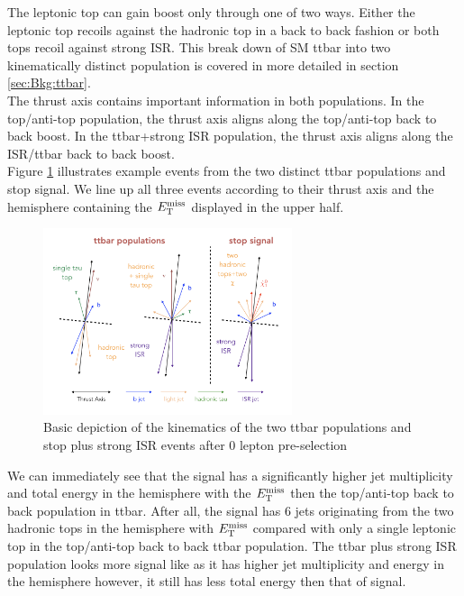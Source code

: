\indent  The leptonic top can gain boost only through one of two ways.  Either the leptonic top recoils against the hadronic top in a back to back fashion or both tops recoil against strong ISR.  This break down of SM ttbar into two kinematically distinct population is covered in more detailed in section \ref{sec:Bkg:ttbar}.  \\

\indent The thrust axis contains important information in both populations.  In the top/anti-top population, the thrust axis aligns along the top/anti-top back to back boost.  In the ttbar+strong ISR population, the thrust axis aligns along the ISR/ttbar back to back boost.  \\

\indent Figure \ref{fig:ttbar:3pop} illustrates example events from the two distinct ttbar populations and stop signal.  We line up all three events according to their thrust axis and the hemisphere containing the $E_{\mathrm{T}}^{\mathrm{miss}}$ displayed in the upper half.  \\

\begin{figure}[h!]
  \centering
	\includegraphics[width=0.65\textwidth]{./figures/strategy/ttbar_vs_signal.png}
\caption{\label{fig:ttbar:3pop}{Basic depiction of the kinematics of the two ttbar populations and stop plus strong ISR events after 0 lepton pre-selection }}
\end{figure}

\indent We can immediately see that the signal has a  significantly higher jet multiplicity and total energy in the hemisphere with the $E_{\mathrm{T}}^{\mathrm{miss}}$ then the top/anti-top back to back population in ttbar.  After all, the signal has 6 jets originating from the two hadronic tops in the hemisphere with $E_{\mathrm{T}}^{\mathrm{miss}}$ compared with only a single leptonic top in the top/anti-top back to back ttbar population.   The ttbar plus strong ISR population looks more signal like as it has higher jet multiplicity and energy in the \MET hemisphere however, it still has less total energy then that of signal.  \\


